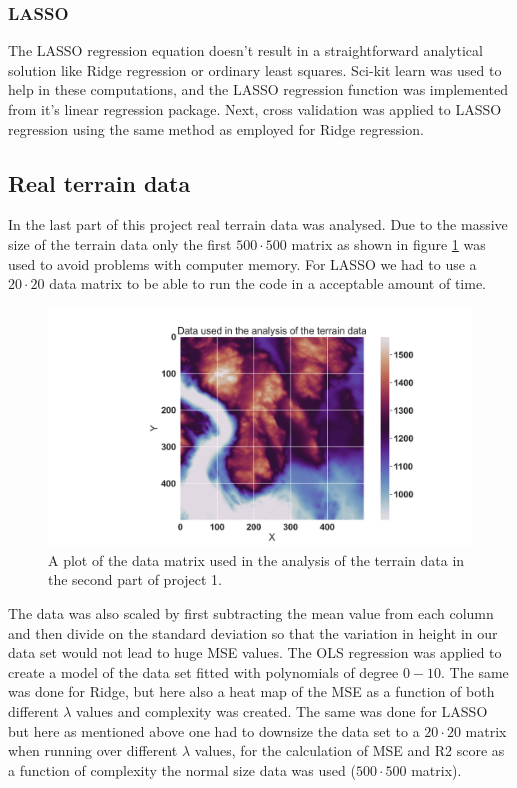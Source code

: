 \subsubsection{LASSO}
\noindent The LASSO regression equation doesn't result in a straightforward analytical solution like Ridge regression or ordinary least squares. Sci-kit learn was used to help in these computations, and the LASSO regression function was implemented from it's linear regression package. 
%
\noindent Next, cross validation was applied to LASSO regression using the same method as employed for Ridge regression.

\subsection{Real terrain data}
\noindent In the last part of this project real terrain data was analysed. Due to the massive size of the terrain data only the first $500 \cdot 500$ matrix as shown in figure \ref{terrain_data} was used to avoid problems with computer memory. For LASSO we had to use a $20 \cdot 20$ data matrix to be able to run the code in a acceptable amount of time. 
\begin{figure}[H]
	\centering
	\includegraphics[width=\linewidth]{images/Figure_11.png}
	\caption{A plot of the data matrix used in the analysis of the terrain data in the second part of project 1.}
    \label{terrain_data}
\end{figure}
The data was also scaled by first subtracting the mean value from each column and then divide on the standard deviation so that the variation in height in our data set would not lead to huge MSE values. The OLS regression was applied to create a model of the data set fitted with polynomials of degree $0-10$. The same was done for Ridge, but here also a heat map of the MSE as a function of both different $\lambda$ values and complexity was created. The same was done for LASSO but here as mentioned above one had to downsize the data set to a $20 \cdot 20$ matrix when running over different $\lambda$ values, for the calculation of MSE and R2 score as a function of complexity the normal size data was used ($500 \cdot 500$ matrix).
